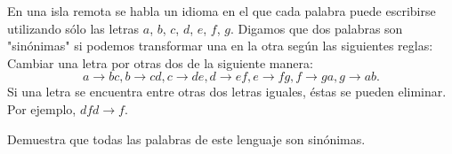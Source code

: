 En una isla remota se habla un idioma en el que cada palabra puede escribirse utilizando sólo las letras $a$, $b$, $c$, $d$, $e$, $f$, $g$. Digamos que dos palabras son "sinónimas" si podemos transformar una en la otra según las siguientes reglas: Cambiar una letra por otras dos de la siguiente manera: \[a \rightarrow bc, b \rightarrow cd, c \rightarrow de, d \rightarrow ef, e \rightarrow fg, f \rightarrow ga, g \rightarrow ab.\] Si una letra se encuentra entre otras dos letras iguales, éstas se pueden eliminar. Por ejemplo, $dfd \rightarrow f$.


Demuestra que todas las palabras de este lenguaje son sinónimas.
